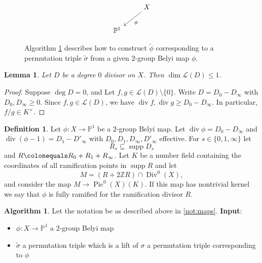 \documentclass{dcthesis}
\newcommand{\PP}{\mathbb P}
\newcommand{\ZZ}{\mathbb Z}
\newcommand{\defi}[1]{\textsf{#1}}
\newcommand{\wt}[1]{\widetilde{#1}}
\newcommand{\LL}{\mathscr L}
\DeclareMathOperator{\Div}{Div}
\DeclareMathOperator{\Pic}{Pic}
\DeclareMathOperator{\ddiv}{div}
\DeclareMathOperator{\ddeg}{deg}
\DeclareMathOperator{\ddim}{dim}
\DeclareMathOperator{\supp}{supp}
\newtheorem{lemma}[prop]{Lemma}
\theoremstyle{definition}
\newtheorem{definition}[prop]{Definition}
\newtheorem{alg}[prop]{Algorithm}
\theoremstyle{remark}
\numberwithin{equation}{section}
\numberwithin{figure}{section}
\begin{document}
{{\begin{figure}[ht]
\[\begin{tikzcd}[ampersand replacement=\&]
          \&X\arrow{dl}{\phi}\\
          \PP^1
        \end{tikzcd}
      \]
      \caption{
      Algorithm \ref{alg:lift} describes how to construct $\wt{\phi}$
        corresponding to a permutation triple $\wt{\sigma}$
        from a given $2$-group Belyi map $\phi$.
      }
    \end{figure}
    \begin{lemma}\label{lem:1dim}
      Let $D$ be a degree $0$ divisor on $X$.
      Then $\ddim\LL(D) \leq 1$.
    \end{lemma}
    \begin{proof}
      Suppose $\ddeg D = 0$, and
      Let $f,g\in\LL(D)\setminus\{0\}$.
      Write $D=D_0-D_\infty$ with $D_0,D_\infty\geq 0$.
      Since $f,g\in\LL(D)$, we have
      $\ddiv f,\ddiv g\geq D_0-D_\infty$.
      In particular,
      $f/g\in K^\times$.
    \end{proof}
    \begin{definition}
      \label{def:ramificationful}
      Let $\phi\colon X\to\PP^1$ be a $2$-group Belyi map.
      Let $\ddiv\phi = D_0-D_\infty$
      and $\ddiv(\phi-1) = D_1 - D'_\infty$
      with $D_0, D_1, D_\infty, D'_\infty$ effective.
      For $s\in\{0,1,\infty\}$ let
      \[
        R_s \subseteq \supp D_s
      \]
      and $R\colonequals R_0+R_1+R_\infty$.
      Let $K$ be a number field
      containing the coordinates of
      all ramification points in $\supp R$
      and
      let
      \begin{equation}
        \label{eqn:ramificationful}
        M = (R+2\ZZ R)\cap\Div^0(X),
      \end{equation}
      and consider the map
      $M\to\Pic^0(X)(K)$.
      If this map has nontrivial kernel we say that
      $\phi$ is
      \defi{fully ramified for the ramification divisor $R$}.
    \end{definition}
    \begin{alg}\label{alg:lift}
      Let the notation be as described above in \ref{not:maps}.
      \newline
      \textbf{Input}:
      \begin{itemize}
        \item 
          $\phi:X\to\PP^1$ a $2$-group Belyi map
        \item
          $\wt{\sigma}$ a permutation triple which is a lift
          of $\sigma$ a permutation triple corresponding to $\phi$

\end{itemize}
\end{alg}}}
\end{document}
